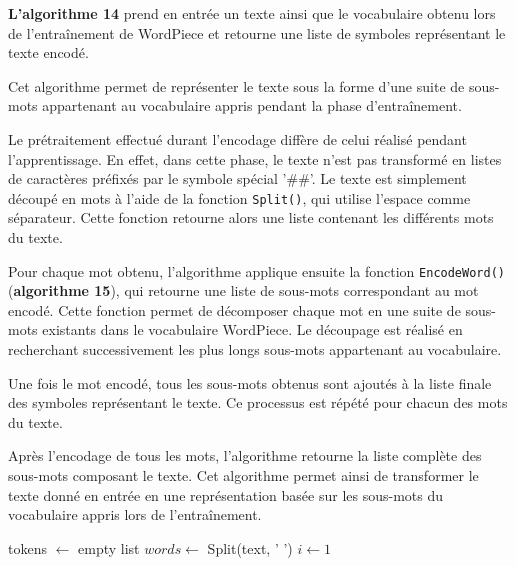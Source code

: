 \documentclass[12pt,a4paper]{report}
\begin{document}
	\vspace{0.5cm}
	
	\textbf{L’algorithme 14} prend en entrée un texte ainsi que le vocabulaire obtenu lors de l’entraînement de WordPiece et retourne une liste de symboles représentant le texte encodé.
	
	Cet algorithme permet de représenter le texte sous la forme d’une suite de sous-mots appartenant au vocabulaire appris pendant la phase d’entraînement.
	
	Le prétraitement effectué durant l’encodage diffère de celui réalisé pendant l’apprentissage. En effet, dans cette phase, le texte n’est pas transformé en listes de caractères préfixés par le symbole spécial '\#\#'. Le texte est simplement découpé en mots à l’aide de la fonction \texttt{Split()}, qui utilise l’espace comme séparateur. Cette fonction retourne alors une liste contenant les différents mots du texte.
	
	Pour chaque mot obtenu, l’algorithme applique ensuite la fonction \texttt{EncodeWord()}(\textbf{algorithme 15}), qui retourne une liste de sous-mots correspondant au mot encodé. Cette fonction permet de décomposer chaque mot en une suite de sous-mots existants dans le vocabulaire WordPiece. Le découpage est réalisé en recherchant successivement les plus longs sous-mots appartenant au vocabulaire.
	
	Une fois le mot encodé, tous les sous-mots obtenus sont ajoutés à la liste finale des symboles représentant le texte. Ce processus est répété pour chacun des mots du texte.
	
	Après l’encodage de tous les mots, l’algorithme retourne la liste complète des sous-mots composant le texte. Cet algorithme permet ainsi de transformer le texte donné en entrée en une représentation basée sur les sous-mots du vocabulaire appris lors de l’entraînement.
	\begin{algorithm}[H]
		\caption{EncodeText}
		
		
		tokens $\leftarrow$ empty list\;
		$words \leftarrow$ Split(text, ' ')\;
		$i \leftarrow 1$
		
		
		
	\end{algorithm}
	
\end{document}
